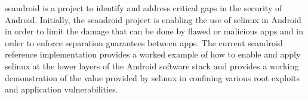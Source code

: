 \ac{seandroid} is a project to identify and address critical gaps in the security of Android.
Initially, the \ac{seandroid} project is enabling the use of \ac{selinux} in Android in order to limit the damage that can be done by flawed or malicious apps and in order to enforce separation guarantees between apps.
The current \ac{seandroid} reference implementation provides a worked example of how to enable and apply \ac{selinux} at the lower layers of the Android software stack and provides a working demonstration of the value provided by \ac{selinux} in confining various root exploits and application vulnerabilities.
\cite{wiki:seandroid}

